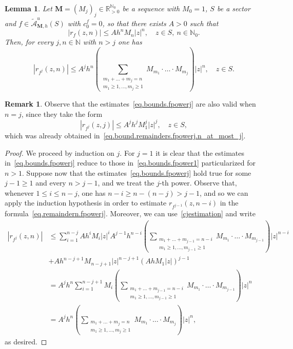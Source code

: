 \documentclass[11pt,a4paper]{article}
\theoremstyle{plain}
\newtheorem{lemma}[proposition]{Lemma}
\theoremstyle{definition}
\newtheorem{remark}[proposition]{Remark}
\newcommand{\RR}{\mathbb{R}}
\newcommand{\NN}{\mathbb{N}}
\newcommand{\M}{\mathbf{M}}
\newcommand{\m}{\boldsymbol{m}}
\begin{document}
\begin{lemma}\label{lemma.bounds.powers}
Let $\M=(M_j)_j\in\RR_{>0}^{\NN_0}$ be a sequence with $M_0=1$, $S$ be a sector and $f\in\widetilde{\mathcal{A}}_{\M,h}^{u}(S)$ with $c^f_0=0$, so that there exists $A>0$ such that
\begin{equation}\label{eq.bounds.fpower1}
    |r_f(z,n)|\le A h^n M_n |z|^n,\quad z\in S,\ n\in\NN_0.
\end{equation}
Then, for every $j,n\in\NN$ with $n>j$ one has
\begin{equation}\label{eq.bounds.fpowerj}
    |r_{f^j}(z,n)|\le A^j h^n \left(\sum_{\substack{m_1+\dots+m_j=n\\m_1\ge 1,\dots,m_j\ge 1}}M_{m_1}\cdot\ldots \cdot M_{m_j}\right) |z|^n,\quad z\in S.
\end{equation}
\end{lemma}
\begin{remark}
Observe that the estimates~\eqref{eq.bounds.fpowerj} are also valid when $n=j$, since they take the form
$$
|r_{f^j}(z,j)|\le A^jh^jM_1^j|z|^j,\quad z\in S,
$$
which was already obtained in~\eqref{eq.bound.remainders.fpowerj.n_at_most_j}.
\end{remark}
\begin{proof}
We proceed by induction on $j$. For $j=1$ it is clear that the estimates in~\eqref{eq.bounds.fpowerj} reduce to those in~\eqref{eq.bounds.fpower1} particularized for $n>1$. Suppose now that the estimates~\eqref{eq.bounds.fpowerj} hold true for some $j-1\ge 1$ and every $n>j-1$, and we treat the $j$-th power. 
Observe that, whenever $1\leq i \leq n-j$, one has $n-i\geq n-(n-j)>j-1$, and so we can apply the induction hypothesis in order to estimate $r_{f^{j-1}}(z,n-i)$ in the formula~\eqref{eq.remaindern.fpowerj}. Moreover, we can use~\eqref{cjestimation} and write
\begin{align*}
|r_{f^j}(z,n)|&\leq \sum_{i=1}^{n-j}Ah^iM_i|z|^iA^{j-1}h^{n-i}\left(\sum_{\substack{m_1+\dots+m_{j-1}=n-i\\ m_1\ge 1,\dots,m_{j-1}\ge 1}}M_{m_1}\cdot\ldots \cdot M_{m_{j-1}}\right)|z|^{n-i}\\
&+Ah^{n-j+1}M_{n-j+1}|z|^{n-j+1}(AhM_1|z|)^{j-1}\\
&=A^j h^n \sum_{i=1}^{n-j+1}M_i\left(\sum_{\substack{m_1+\dots+m_{j-1}=n-i\\m_1\ge 1,\dots,m_{j-1}\ge 1}}M_{m_1}\cdot\ldots \cdot M_{m_{j-1}}\right) |z|^n\\
&=A^j h^n \left(\sum_{\substack{m_1+\dots+m_j=n\\m_1\ge 1,\dots,m_j\ge 1}}M_{m_1}\cdot\ldots \cdot M_{m_j}\right) |z|^n,
	\end{align*}
as desired.
\end{proof}
\end{document}
